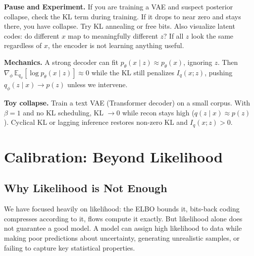 \vspace{1.5em}

\begin{pausebox}
\textbf{Pause and Experiment.} If you are training a VAE and suspect posterior collapse, check the KL term during training. If it drops to near zero and stays there, you have collapse. Try KL annealing or free bits. Also visualize latent codes: do different $x$ map to meaningfully different $z$? If all $z$ look the same regardless of $x$, the encoder is not learning anything useful.
\end{pausebox}

\vspace{2em}


\vspace{0.3cm}
\textbf{Mechanics.} A strong decoder can fit $p_\theta(x\mid z)\approx p_\theta(x)$, ignoring $z$. Then $\nabla_\phi\,\mathbb{E}_{q_\phi}[\log p_\theta(x\mid z)]\approx 0$ while the KL still penalizes $I_q(x;z)$, pushing $q_\phi(z\mid x)\to p(z)$ unless we intervene.
\vspace{0.3cm}
\begin{examplebox}
\textbf{Toy collapse.} Train a text VAE (Transformer decoder) on a small corpus. With $\beta{=}1$ and no KL scheduling, KL $\to 0$ while recon stays high ($q(z\mid x)\approx p(z)$). Cyclical KL or lagging inference restores non-zero KL and $I_q(x;z)>0$.
\end{examplebox}
\section{Calibration: Beyond Likelihood}
\vspace{0.3cm}
\label{sec:calibration}

\vspace{1em}

\subsection{Why Likelihood is Not Enough}

We have focused heavily on likelihood: the ELBO bounds it, bits-back coding compresses according to it, flows compute it exactly. But likelihood alone does not guarantee a good model. A model can assign high likelihood to data while making poor predictions about uncertainty, generating unrealistic samples, or failing to capture key statistical properties.

